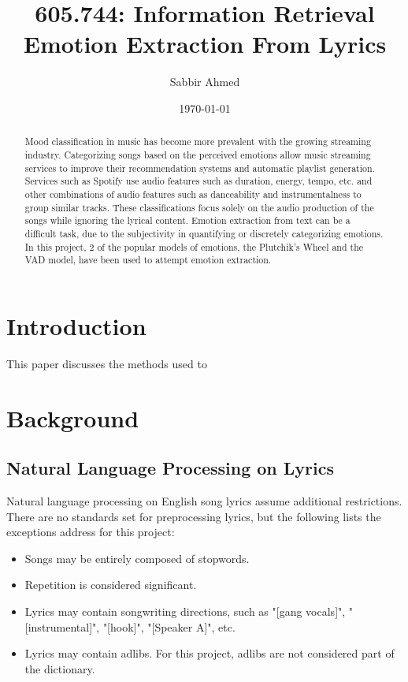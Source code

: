 \documentclass[11pt]{article}
\title{605.744: Information Retrieval \\ Emotion Extraction From Lyrics}
\author{Sabbir Ahmed}
\date{\today}
\begin{document}
\maketitle
\tableofcontents
\clearpage
\newpage

\begin{abstract}
  \noindent Mood classification in music has become more prevalent with the growing streaming industry. Categorizing songs based on the perceived emotions allow music streaming services to improve their recommendation systems and automatic playlist generation. Services such as Spotify use audio features such as duration, energy, tempo, etc. and other combinations of audio features such as danceability and instrumentalness to group similar tracks. These classifications focus solely on the audio production of the songs while ignoring the lyrical content. Emotion extraction from text can be a difficult task, due to the subjectivity in quantifying or discretely categorizing emotions. In this project, 2 of the popular models of emotions, the Plutchik's Wheel and the VAD model, have been used to attempt emotion extraction.
\end{abstract}

\section{Introduction}
This paper discusses the methods used to

\section{Background}

\subsection{Natural Language Processing on Lyrics}

Natural language processing on English song lyrics assume additional restrictions. There are no standards set for preprocessing lyrics, but the following lists the exceptions address for this project:
\begin{itemize}
  \item Songs may be entirely composed of stopwords.
  \item Repetition is considered significant.
  \item Lyrics may contain songwriting directions, such as "[gang vocals]", "[instrumental]", "[hook]", "[Speaker A]", etc.
  \item Lyrics may contain adlibs. For this project, adlibs are not considered part of the dictionary.
\end{itemize}
\end{document}
